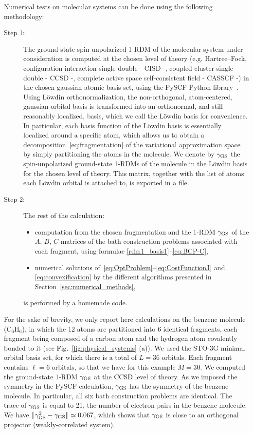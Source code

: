 \documentclass{article}
\newcommand{\1}{{\mathds 1}}
\begin{document}
Numerical tests on molecular systems can be done using the following methodology: 
\begin{description}
    \item[Step 1:] The ground-state spin-unpolarized 1-RDM of the molecular system under consideration is computed at the chosen level of theory (e.g. Hartree--Fock, configuration interaction single-double - CISD -, coupled-cluster single-double - CCSD -, complete active space self-consistent field - CASSCF -) in the chosen gaussian atomic basis set, using the PySCF Python library~\cite{sun2020recent,sun2018pyscf,sun2015libcint}. Using L\"owdin orthonormalization, the non-orthogonal, atom-centered, gaussian-orbital basis is transformed into an orthonormal, and still reasonably localized, basis, which we call the L\"owdin basis for convenience. In particular, each basis function of the L\"owdin basis is essentially localized around a specific atom, which allows us to obtain a decomposition~\eqref{eq:fragmentation} of the variational approximation space by simply partitioning the atoms in the molecule. We denote by $\gamma_{\rm GS}$ the spin-unpolarized ground-state 1-RDMs of the molecule in the L\"owdin basis for the chosen level of theory. This matrix, together with the list of atoms each L\"owdin orbital is attached to, is exported in a file.
    \item[Step 2:] The rest of the calculation:
    \begin{itemize}
\item computation from the chosen fragmentation and the 1-RDM $\gamma_{\rm GS}$ of the $A$, $B$, $C$ matrices of the bath construction problems associated with each fragment, using formulae \eqref{rdm1_basis1}--\eqref{eq:BCP-C},
\item numerical solutions of~\eqref{eq:OptProblem}--\eqref{eq:CostFunctionJ} and \eqref{eq:convexification} by the different algorithms presented in Section~\ref{sec:numerical_methods},
\end{itemize}
is performed by a homemade code.
\end{description}

For the sake of brevity, we only report here calculations on the benzene molecule (C$_6$H$_6$), in which the 12 atoms are partitioned into 6 identical fragments, each fragment being composed of a carbon atom and the hydrogen atom covalently bonded to it (see Fig.~\ref{fig:physical_systems} (a)). We used the STO-3G minimal orbital basis set, for which there is a total of $L=36$ orbitals. Each fragment contains $\ell=6$ orbitals, so that we have for this example $M=30$. We computed the ground-state 1-RDM $\gamma_{\rm GS}$ at the CCSD level of theory. As we imposed the symmetry in the PySCF calculation, $\gamma_{\rm GS}$ has the symmetry of the benzene molecule. In particular, all six bath construction problems are identical. The trace of $\gamma_{\rm GS}$ is equal to 21, the number of electron pairs in the benzene molecule. We have $\|\gamma_{\rm GS}^2-\gamma_{\rm GS}\| \simeq 0.067$,
which shows that $\gamma_{\rm GS}$ is close to an orthogonal projector (weakly-correlated system).
\end{document}
